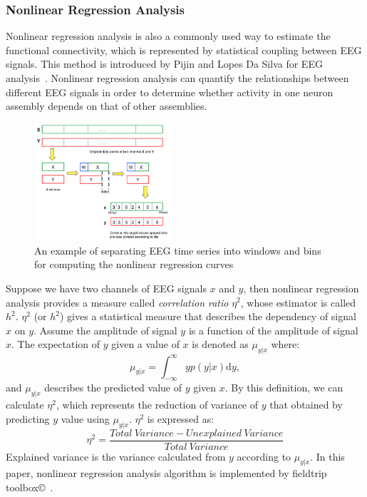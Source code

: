 \subsubsection{Nonlinear Regression Analysis}
Nonlinear regression analysis is also a commonly used way to estimate the functional connectivity, which is represented by statistical coupling between EEG signals. This method is introduced by Pijin and Lopes Da Silva for EEG analysis~\cite{pijn1990localization}. Nonlinear regression analysis can quantify the relationships between different EEG signals in order to determine whether activity in one neuron assembly depends on that of other assemblies.
\begin{figure}[!t]
    \centering
    \includegraphics[width=0.45\textwidth]{./images/binsepa.png}
    \caption{An example of separating EEG time series into windows and bins for computing the nonlinear regression curves}
    \label{fig:bin}
\end{figure}
Suppose we have two channels of EEG signals $x$ and $y$, then nonlinear regression analysis provides a measure called \emph{correlation ratio} $\eta^2$, whose estimator is called $h^2$. $\eta^2$ (or $h^2$) gives a statistical measure that describes the dependency of signal $x$ on $y$. Assume the amplitude of signal $y$ is a function of the amplitude of signal $x$. The expectation of $y$ given a value of $x$ is denoted as $\mu_{y|x}$ where:
\begin{equation} \label{eq:regressioncurve}
\mu_{y|x} = \int_{-\infty}^{\infty} y p(y|x) \mathrm{d}y,
\end{equation}
and $\mu_{y|x}$ describes the predicted value of $y$ given $x$. By this definition, we can calculate $\eta^2$, which represents the reduction of variance of $y$ that obtained by predicting $y$ value using $\mu_{y|x}$. $\eta^2$ is expressed as:
\begin{equation} \label{eq:NRAregression}
\eta^2 = \frac{Total \ Variance - Unexplained \ Variance}{Total \ Variance}
\end{equation}
Explained variance is the variance calculated from $y$ according to $\mu_{y|x}$. In this paper, nonlinear regression analysis algorithm is implemented by fieldtrip toolbox\copyright~\cite{oostenveld2010fieldtrip}.

